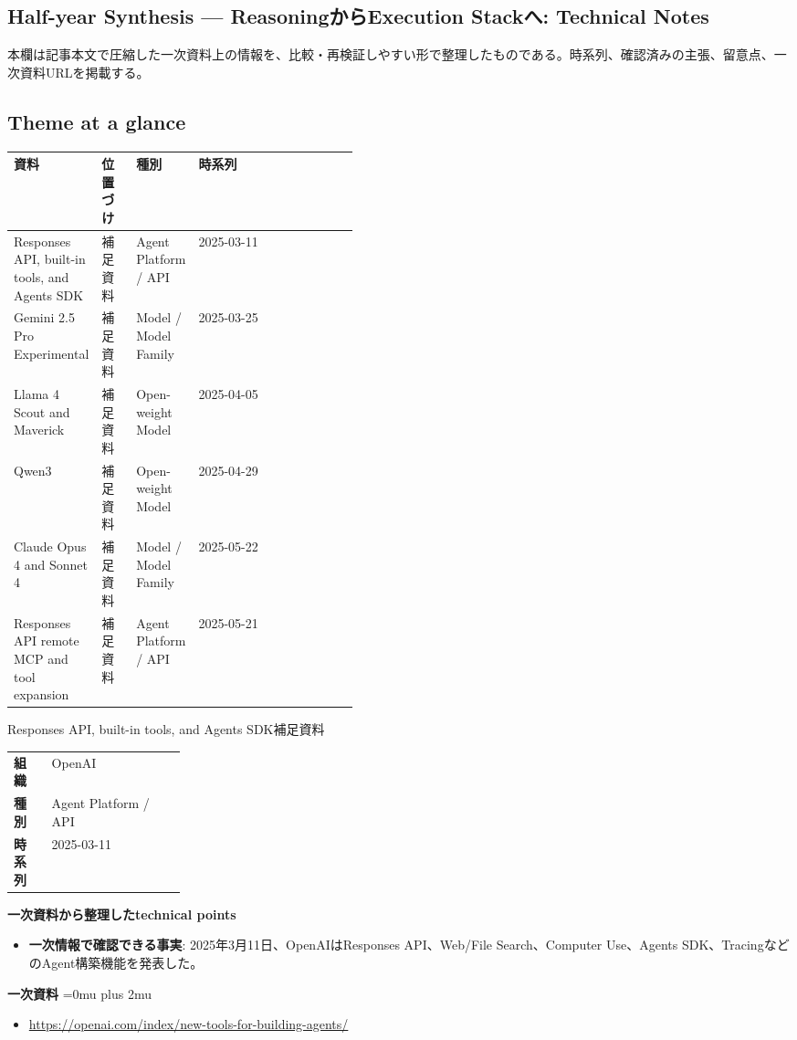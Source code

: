 \subsection*{Half-year Synthesis — ReasoningからExecution Stackへ: Technical Notes}
本欄は記事本文で圧縮した一次資料上の情報を、比較・再検証しやすい形で整理したものである。時系列、確認済みの主張、留意点、一次資料URLを掲載する。
\medskip
\subsection*{Theme at a glance}
\begin{center}
\footnotesize
\begin{tabularx}{\linewidth}{@{}p{0.20\linewidth}p{0.10\linewidth}p{0.14\linewidth}X@{}}
\toprule
資料 & 位置づけ & 種別 & 時系列 \\
\midrule
Responses API, built-in tools, and Agents SDK & 補足資料 & Agent Platform / API & 2025-03-11 \\
Gemini 2.5 Pro Experimental & 補足資料 & Model / Model Family & 2025-03-25 \\
Llama 4 Scout and Maverick & 補足資料 & Open-weight Model & 2025-04-05 \\
Qwen3 & 補足資料 & Open-weight Model & 2025-04-29 \\
Claude Opus 4 and Sonnet 4 & 補足資料 & Model / Model Family & 2025-05-22 \\
Responses API remote MCP and tool expansion & 補足資料 & Agent Platform / API & 2025-05-21 \\
\bottomrule
\end{tabularx}
\end{center}
\normalsize

\begin{technicalnote}{Responses API, built-in tools, and Agents SDK}{補足資料}
\begingroup
\begin{tabularx}{\linewidth}{@{}>{\bfseries}p{0.22\linewidth}X@{}}
組織 & OpenAI \\
種別 & Agent Platform / API \\
時系列 & 2025-03-11 \\
\end{tabularx}
\smallskip
{\bfseries 一次資料から整理したtechnical points}
\begin{itemize}[leftmargin=1.5em,itemsep=0.35em]
\item \textbf{一次情報で確認できる事実}: 2025年3月11日、OpenAIはResponses API、Web/File Search、Computer Use、Agents SDK、TracingなどのAgent構築機能を発表した。
\end{itemize}
\begin{samepage}
{\bfseries 一次資料}
\begingroup\sloppy
\Urlmuskip=0mu plus 2mu\relax
\begin{itemize}[leftmargin=1.5em,itemsep=0.25em]
\item {\scriptsize\url{https://openai.com/index/new-tools-for-building-agents/}}
\end{itemize}
\endgroup
\end{samepage}
\endgroup
\end{technicalnote}
\medskip

